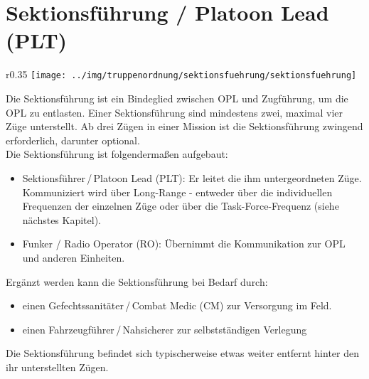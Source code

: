 \section{Sektionsführung / Platoon Lead (PLT)}
\begin{wrapfigure}{r}{0.35\textwidth}
	\vspace{-20pt}
	\centering 
	\texttt{[image: ../img/truppenordnung/sektionsfuehrung/sektionsfuehrung]}
	\vspace{-5pt}
\end{wrapfigure}	
Die Sektionsführung ist ein Bindeglied zwischen OPL und Zugführung, um die OPL zu entlasten. Einer Sektionsführung sind mindestens zwei, maximal vier Züge unterstellt. Ab drei Zügen in einer Mission ist die Sektionsführung zwingend erforderlich, darunter optional.\\

Die Sektionsführung ist folgendermaßen aufgebaut:
\begin{itemize}
	\item Sektionsführer\,/\,Platoon Lead (PLT): Er leitet die ihm untergeordneten Züge. Kommuniziert wird über Long-Range - entweder über die individuellen Frequenzen der einzelnen Züge oder über die Task-Force-Frequenz (siehe nächstes Kapitel).
	\item Funker / Radio Operator (RO): Übernimmt die Kommunikation zur OPL und anderen Einheiten.
\end{itemize}
Ergänzt werden kann die Sektionsführung bei Bedarf durch:
\begin{itemize}
	\setlength\itemsep{0em}
	\item einen Gefechtssanitäter\,/\,Combat Medic (CM) zur Versorgung im Feld.
	\item einen Fahrzeugführer\,/\,Nahsicherer zur selbstständigen Verlegung
\end{itemize} 
Die Sektionsführung befindet sich typischerweise etwas weiter entfernt hinter den ihr unterstellten Zügen.
